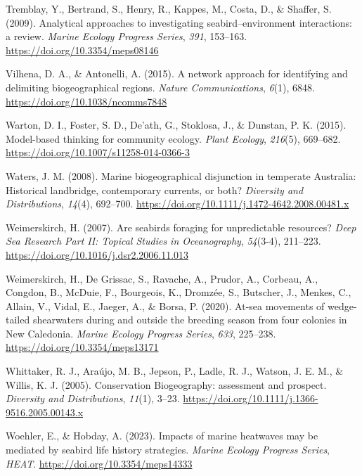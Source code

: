 \documentclass{article}
\newlength{\cslhangindent}
\newlength{\cslentryspacingunit} %
\newenvironment{CSLReferences}[2] %
 {%
  \setlength{\parindent}{0pt}
  \ifodd #1
  \let\oldpar\par
  \def\par{\hangindent=\cslhangindent\oldpar}
  \fi
  \setlength{\parskip}{#2\cslentryspacingunit}
 }%
 {}
\begin{document}
\begin{linenumbers}
\begin{CSLReferences}{1}{0}
\leavevmode{}%
Tremblay, Y., Bertrand, S., Henry, R., Kappes, M., Costa, D., \& Shaffer, S. (2009). Analytical approaches to investigating seabird--environment interactions: a review. \emph{Marine Ecology Progress Series}, \emph{391}, 153--163. \url{https://doi.org/10.3354/meps08146}

\leavevmode{}%
Vilhena, D. A., \& Antonelli, A. (2015). A network approach for identifying and delimiting biogeographical regions. \emph{Nature Communications}, \emph{6}(1), 6848. \url{https://doi.org/10.1038/ncomms7848}

\leavevmode{}%
Warton, D. I., Foster, S. D., De'ath, G., Stoklosa, J., \& Dunstan, P. K. (2015). Model-based thinking for community ecology. \emph{Plant Ecology}, \emph{216}(5), 669--682. \url{https://doi.org/10.1007/s11258-014-0366-3}

\leavevmode{}%
Waters, J. M. (2008). Marine biogeographical disjunction in temperate {A}ustralia: Historical landbridge, contemporary currents, or both? \emph{Diversity and Distributions}, \emph{14}(4), 692--700. \url{https://doi.org/10.1111/j.1472-4642.2008.00481.x}

\leavevmode{}%
Weimerskirch, H. (2007). Are seabirds foraging for unpredictable resources? \emph{Deep Sea Research Part II: Topical Studies in Oceanography}, \emph{54}(3-4), 211--223. \url{https://doi.org/10.1016/j.dsr2.2006.11.013}

\leavevmode{}%
Weimerskirch, H., De Grissac, S., Ravache, A., Prudor, A., Corbeau, A., Congdon, B., McDuie, F., Bourgeois, K., Dromzée, S., Butscher, J., Menkes, C., Allain, V., Vidal, E., Jaeger, A., \& Borsa, P. (2020). At-sea movements of wedge-tailed shearwaters during and outside the breeding season from four colonies in New Caledonia. \emph{Marine Ecology Progress Series}, \emph{633}, 225--238. \url{https://doi.org/10.3354/meps13171}

\leavevmode{}%
Whittaker, R. J., Araújo, M. B., Jepson, P., Ladle, R. J., Watson, J. E. M., \& Willis, K. J. (2005). Conservation Biogeography: assessment and prospect. \emph{Diversity and Distributions}, \emph{11}(1), 3--23. \url{https://doi.org/10.1111/j.1366-9516.2005.00143.x}

\leavevmode{}%
Woehler, E., \& Hobday, A. (2023). Impacts of marine heatwaves may be mediated by seabird life history strategies. \emph{Marine Ecology Progress Series}, \emph{HEAT}. \url{https://doi.org/10.3354/meps14333}


\end{CSLReferences}
\end{linenumbers}
\end{document}
